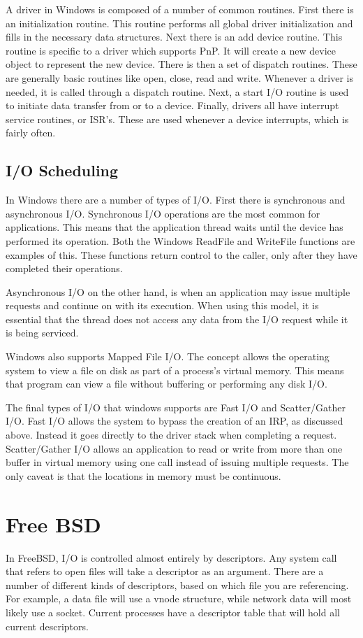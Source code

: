 \documentclass[letterpaper,10pt,titlepage,draftclsnofoot,onecolumn]{IEEEtran}
\begin{document}
A driver in Windows is composed of a number of common routines. First there is an initialization routine. This routine performs all global driver initialization and fills in the necessary data structures. Next there is an add device routine. This routine is specific to a driver which supports PnP. It will create a new device object to represent the new device. There is then a set of dispatch routines. These are generally basic routines like open, close, read and write. Whenever a driver is needed, it is called through a dispatch routine. Next, a start I/O routine is used to initiate data transfer from or to a device. Finally, drivers all have interrupt service routines, or ISR's. \cite{windows} These are used whenever a device interrupts, which is fairly often.

\subsection{I/O Scheduling}
In Windows there are a number of types of I/O. First there is synchronous and asynchronous I/O. Synchronous I/O operations are the most common for applications. This means that the application thread waits until the device has performed its operation. Both the Windows ReadFile and WriteFile functions are examples of this. These functions return control to the caller, only after they have completed their operations. \cite{windows}

Asynchronous I/O on the other hand, is when an application may issue multiple requests and continue on with its execution. When using this model, it is essential that the thread does not access any data from the I/O request while it is being serviced. 

Windows also supports Mapped File I/O. The concept allows the operating system to view a file on disk as part of a process's virtual memory. This means that program can view a file without buffering or performing any disk I/O. \cite{windows}

The final types of I/O that windows supports are Fast I/O and Scatter/Gather I/O. Fast I/O allows the system to bypass the creation of an IRP, as discussed above. Instead it goes directly to the driver stack when completing a request. Scatter/Gather I/O allows an application to read or write from more than one buffer in virtual memory using one call instead of issuing multiple requests. \cite{windows} The only caveat is that the locations in memory must be continuous. 

\section{Free BSD}
In  FreeBSD, I/O is controlled almost entirely by descriptors. Any system call that refers to open files will take a descriptor as an argument. There are a number of different kinds of descriptors, based on which file you are referencing. For example, a data file will use a vnode structure, while network data will most likely use a socket. Current processes have a descriptor table that will hold all current descriptors. \cite{freebsd}
\end{document}
